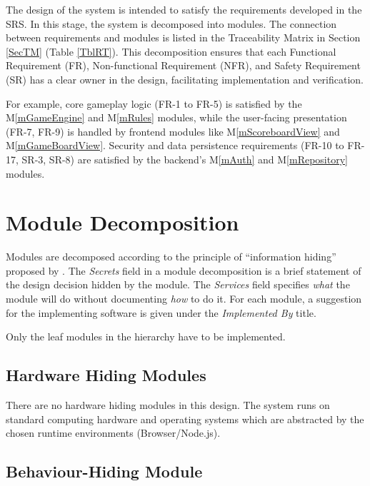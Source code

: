 \documentclass[12pt, titlepage]{article}
\newcommand{\mref}[1]{M\ref{#1}}
\begin{document}
The design of the system is intended to satisfy the requirements developed in
the SRS. In this stage, the system is decomposed into modules. The connection
between requirements and modules is listed in the Traceability Matrix in Section \ref{SecTM} (Table \ref{TblRT}). This decomposition ensures that each Functional Requirement (FR), Non-functional Requirement (NFR), and Safety Requirement (SR) has a clear owner in the design, facilitating implementation and verification.

For example, core gameplay logic (FR-1 to FR-5) is satisfied by the \mref{mGameEngine} and \mref{mRules} modules, while the user-facing presentation (FR-7, FR-9) is handled by frontend modules like \mref{mScoreboardView} and \mref{mGameBoardView}. Security and data persistence requirements (FR-10 to FR-17, SR-3, SR-8) are satisfied by the backend's \mref{mAuth} and \mref{mRepository} modules.

\section{Module Decomposition} \label{SecMD}

Modules are decomposed according to the principle of ``information hiding''
proposed by \citet{ParnasEtAl1984}. The \emph{Secrets} field in a module
decomposition is a brief statement of the design decision hidden by the
module. The \emph{Services} field specifies \emph{what} the module will do
without documenting \emph{how} to do it. For each module, a suggestion for the
implementing software is given under the \emph{Implemented By} title.

Only the leaf modules in the hierarchy have to be implemented.

\subsection{Hardware Hiding Modules}

There are no hardware hiding modules in this design. The system runs on standard computing hardware and operating systems which are abstracted by the chosen runtime environments (Browser/Node.js).

\subsection{Behaviour-Hiding Module}
\end{document}
